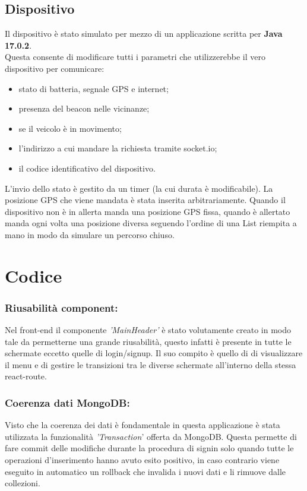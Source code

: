 \documentclass{report}
\begin{document}
\subsection{Dispositivo}
Il dispositivo è stato simulato per mezzo di un applicazione scritta per \textbf{Java 17.0.2}.\\
Questa consente di modificare tutti i parametri che utilizzerebbe il vero dispositivo per comunicare:
\begin{itemize}
    \item stato di batteria, segnale GPS e internet;
    \item presenza del beacon nelle vicinanze;
    \item se il veicolo è in movimento;
    \item l'indirizzo a cui mandare la richiesta tramite socket.io;
    \item il codice identificativo del dispositivo.
\end{itemize}
L'invio dello stato è gestito da un timer (la cui durata è modificabile). La posizione GPS che viene mandata è stata inserita arbitrariamente. Quando il dispositivo non è in allerta manda una posizione GPS fissa, quando è allertato manda ogni volta una posizione diversa seguendo l'ordine di una List riempita a mano in modo da simulare un percorso chiuso.

\section{Codice}
\subsubsection{Riusabilità component:}
Nel front-end il componente \textit{'MainHeader'} è stato volutamente creato in modo tale da permetterne una grande riusabilità, questo infatti è presente in tutte le schermate eccetto quelle di login/signup. Il suo compito è quello di di visualizzare il menu e di gestire le transizioni tra le diverse schermate all'interno della stessa react-route.\\
\subsubsection{Coerenza dati MongoDB:}
Visto che la coerenza dei dati è fondamentale in questa applicazione è stata utilizzata la funzionalità \textit{'Transaction}' offerta da MongoDB. Questa permette di fare commit delle modifiche durante la procedura di signin solo quando tutte le operazioni d'inserimento hanno avuto esito positivo, in caso contrario viene eseguito in automatico un rollback che invalida i nuovi dati e li rimuove dalle collezioni.\\
\end{document}
